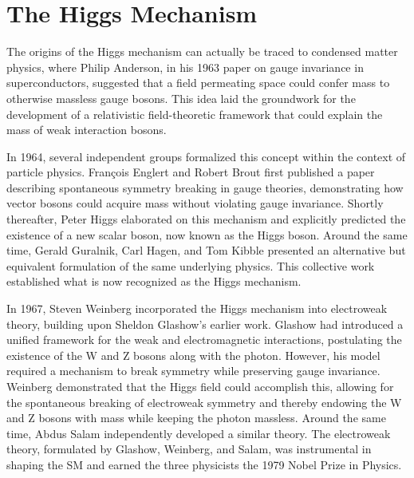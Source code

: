 




\section{The Higgs Mechanism}

The origins of the Higgs mechanism can actually be traced to condensed matter physics, where Philip Anderson, in his 1963 paper on gauge invariance in superconductors, suggested that a field permeating space could confer mass to otherwise massless gauge bosons. This idea laid the groundwork for the development of a relativistic field-theoretic framework that could explain the mass of weak interaction bosons.

In 1964, several independent groups formalized this concept within the context of particle physics. François Englert and Robert Brout first published a paper describing spontaneous symmetry breaking in gauge theories, demonstrating how vector bosons could acquire mass without violating gauge invariance. Shortly thereafter, Peter Higgs elaborated on this mechanism and explicitly predicted the existence of a new scalar boson, now known as the Higgs boson. Around the same time, Gerald Guralnik, Carl Hagen, and Tom Kibble presented an alternative but equivalent formulation of the same underlying physics. This collective work established what is now recognized as the Higgs mechanism.

In 1967, Steven Weinberg incorporated the Higgs mechanism into electroweak theory, building upon Sheldon Glashow’s earlier work. Glashow had introduced a unified framework for the weak and electromagnetic interactions, postulating the existence of the W and Z bosons along with the photon. However, his model required a mechanism to break symmetry while preserving gauge invariance. Weinberg demonstrated that the Higgs field could accomplish this, allowing for the spontaneous breaking of electroweak symmetry and thereby endowing the W and Z bosons with mass while keeping the photon massless. Around the same time, Abdus Salam independently developed a similar theory. The electroweak theory, formulated by Glashow, Weinberg, and Salam, was instrumental in shaping the SM and earned the three physicists the 1979 Nobel Prize in Physics.

